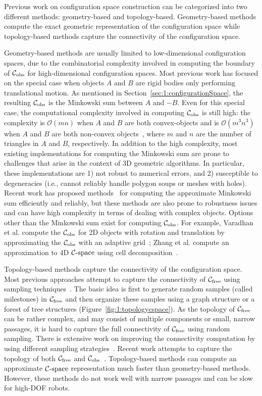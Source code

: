 Previous work on configuration space construction can be categorized into two different methods: geometry-based and topology-based. Geometry-based methods compute the exact geometric representation of the configuration space while topology-based methods capture the connectivity of the configuration space.

Geometry-based methods are usually limited to low-dimensional configuration spaces, due to the combinatorial complexity involved in computing the boundary of $\mathcal C_{\text{obs}}$ for high-dimensional configuration spaces. Most previous work has focused on the special case when objects $A$ and $B$ are rigid bodies only performing translational motion. As mentioned in Section~\ref{sec:1:configurationSpace}, the resulting $\mathcal C_{\text{obs}}$ is the Minkowski sum between $A$ and $-B$. Even for this special case, the computational complexity involved in computing $\mathcal C_{\text{obs}}$ is still high: the complexity is $\mathcal O(mn)$ when $A$ and $B$ are both convex-objects and is $\mathcal O(m^3n^3)$ when $A$ and $B$ are both non-convex objects~\cite{Halperin:2002:RGC}, where $m$ and $n$ are the number of triangles in $A$ and $B$, respectively. In addition to the high complexity, most existing implementations for computing the Minkowski sum are prone to challenges that arise in the context of 3D geometric algorithms. In particular, these implementations are 1) not robust to numerical errors, and 2) susceptible to degeneracies (i.e., cannot reliably handle polygon soups or meshes with holes). Recent work has proposed methods~\cite{Lien:2008:CMS,Lien:2007:ACD,Lien:2009:ASM} for computing the approximate Minkowski sum efficiently and reliably, but these methods are also prone to robustness issues and can have high complexity in terms of dealing with complex objects. Options other than the Minkowski sum exist for computing  $\mathcal C_{\text{obs}}$. For example, Varadhan et al. compute the $\mathcal C_{\text{obs}}$ for 2D objects with rotation and translation by approximating the $\mathcal C_{\text{obs}}$ with an adaptive grid~\cite{Varadhan:2006:TPA}; Zhang et al. compute an approximation to 4D $\mathcal C\text{-space}$ using cell decomposition~\cite{Zhang:2007:IROS}.

Topology-based methods capture the connectivity of the configuration space. Most previous approaches attempt to capture the connectivity of $\mathcal C_{\text{free}}$ using sampling techniques~\cite{Kavraki96,Kuffner00}. The basic idea is first to generate random samples (called milestones) in $\mathcal C_{\text{free}}$ and then organize these samples using a graph structure or a forest of tree structures (Figure~\ref{fig:1:topologycspace}). As the topology of $\mathcal C_{\text{free}}$ can be rather complex, and
may consist of multiple components or small, narrow passages, it is hard to capture the full connectivity of $\mathcal C_{\text{free}}$ using random sampling. There is extensive work on improving the connectivity computation by using different sampling strategies~\cite{Amato:1998:OOP,Boor:1999:ICRA,Hsu:1998:FNP,Rodriguez:2006,Zhang:2008:ICRA,Zheng:2005}. Recent work attempts to capture the topology of both $\mathcal C_{\text{free}}$ and $\mathcal C_{\text{obs}}$~\cite{Jory:2011:IROS}. Topology-based methods can compute an approximate $\mathcal C\text{-space}$ representation much faster than geometry-based methods. However, these methods do not work well with narrow passages and can be slow for high-DOF robots.


